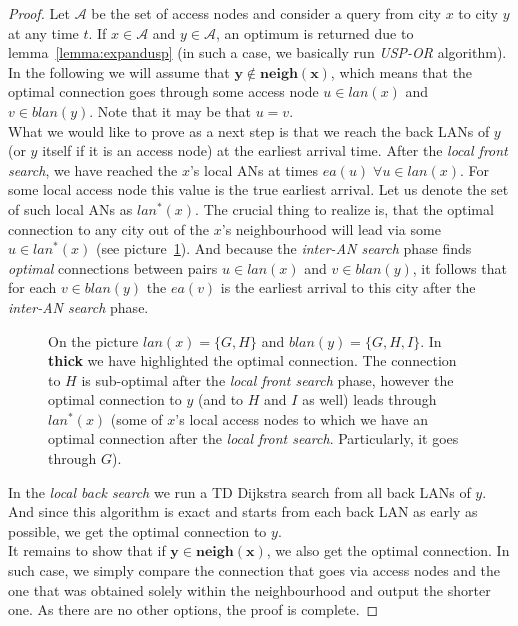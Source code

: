 		\begin{proof}
			Let $\mathcal{A}$ be the set of access nodes and consider a query from city $x$ to city $y$ at any time $t$. If $x \in \mathcal{A}$ and $y \in \mathcal{A}$, an optimum is returned due to lemma~\ref{lemma:expandusp} (in such a case, we basically run \textit{USP-OR} algorithm). \\
			
			\noindent In the following we will assume that $\bm{y \not \in neigh(x)}$, which means that the optimal connection goes through some access node $u \in lan(x)$ and $v \in blan(y)$. Note that it may be that $u = v$. \\
			
			\noindent What we would like to prove as a next step is that we reach the back LANs of $y$ (or $y$ itself if it is an access node) at the earliest arrival time. After the \textit{local front search}, we have reached the $x$'s local ANs at times $ea(u) \; \forall u \in lan(x)$. For some local access node this value is the true earliest arrival. Let us denote the set of such local ANs as $lan^{*}(x)$. The crucial thing to realize is, that the optimal connection to any city out of the $x$'s neighbourhood will lead via some $u \in lan^{*}(x)$ (see picture~\ref{fig:usporaproof2}). And because the \textit{inter-AN search} phase finds \textit{optimal} connections between pairs $u \in lan(x)$ and $v \in blan(y)$, it follows that for each $v \in blan(y)$ the $ea(v)$ is the earliest arrival to this city after the \textit{inter-AN search} phase.
			
			\begin{figure}[h!]
				\begin{center}
				\end{center}
				\caption{\label{fig:usporaproof2} On the picture $lan(x) = \{G, H\}$ and $blan(y) = \{G, H, I\}$. In \textbf{thick} we have highlighted the optimal connection. The connection to $H$ is sub-optimal after the \textit{local front search} phase, however the optimal connection to $y$ (and to $H$ and $I$ as well) leads through $lan^{*}(x)$ (some of $x$'s local access nodes to which we have an optimal connection after the \textit{local front search}. Particularly, it goes through $G$).}
			\end{figure}
			
			In the \textit{local back search} we run a TD Dijkstra search from all back LANs of $y$. And since this algorithm is exact and starts from each back LAN as early as possible, we get the optimal connection to $y$. \\
			
			\noindent It remains to show that if $\bm{y \in neigh(x)}$, we also get the optimal connection. In such case, we simply compare the connection that goes via access nodes and the one that was obtained solely within the neighbourhood and output the shorter one. As there are no other options, the proof is complete.
		\end{proof}
	

